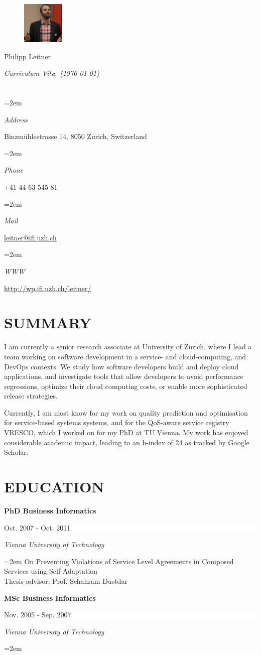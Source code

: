 \documentclass[paper=letter,fontsize=11pt]{scrartcl} %
\newlength{\spacebox}
\newcommand{\sepspace}{\vspace*{1em}}		%
\newcommand{\MyName}[1]{ %
		\Huge \usefont{OT1}{phv}{b}{n} \hfill #1
		\par \normalsize \normalfont}
\newcommand{\MySlogan}[1]{ %
		\large \usefont{OT1}{phv}{m}{n}\hfill \textit{#1}
		\par \normalsize \normalfont}
\newcommand{\NewPart}[2]{\section*{\uppercase{#1} #2}}
\newcommand{\PersonalEntry}[2]{
		\noindent\hangindent=2em\hangafter=0 %
		\parbox{\spacebox}{        %
		\textit{#1}}		       %
		\hspace{1.5em} #2 \par}    %
\newcommand{\EducationEntry}[4]{
		\noindent \textbf{#1} \hfill      %
		\colorbox{White}{%
			\parbox{10em}{%
			\hfill\color{Black}#2}} \par  %
		\noindent \textit{#3} \par        %
		\noindent\hangindent=2em\hangafter=0 \small #4 %
		\normalsize \par}
\begin{document}

\begin{figure}
	\vspace*{-2em}
		\includegraphics[width=0.18\textwidth]{profile.png}
\end{figure}

\MyName{Philipp Leitner}
\MySlogan{Curriculum Vit\ae\ (\today)}

\sepspace

\NewPart{}{}

\PersonalEntry{Address}{Binzm\"uhlestrasse 14,
  8050 Zurich, Switzerland}
\PersonalEntry{Phone}{+41 44 63 545 81}
\PersonalEntry{Mail}{\href{mailto:leitner@ifi.uzh.ch}{leitner@ifi.uzh.ch}}
\PersonalEntry{WWW}{\href{http://wp.ifi.uzh.ch/leitner/}{http://wp.ifi.uzh.ch/leitner/}}

\NewPart{Summary}{}
I am currently a senior research associate at University of Zurich, where I lead a team working on software development in a service- and cloud-computing, and DevOps contexts. We study how software developers build and deploy cloud applications, and investigate tools that allow developers to avoid performance regressions, optimize their cloud computing costs, or enable more sophisticated release strategies.

Currently, I am most know for my work on quality prediction and optimisation for service-based systems systems, and for the QoS-aware service registry VRESCO, which I worked on for my PhD at TU Vienna. My work has enjoyed considerable academic impact, leading to an h-index of 24 as tracked by Google Scholar.


\NewPart{Education}{}

\EducationEntry{PhD Business Informatics}{Oct. 2007 - Oct. 2011}{Vienna
University of Technology}{On Preventing Violations of Service Level Agreements in Composed Services using Self-Adaptation\\
Thesis advisor: Prof. Schahram Dustdar}
\sepspace

\EducationEntry{MSc Business Informatics}{Nov. 2005 - Sep. 2007}{Vienna
University of Technology}{}
\end{document}
